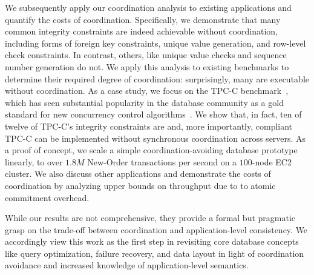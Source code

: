 
We subsequently apply our \iconfluence coordination analysis to
existing applications and quantify the costs of
coordination. Specifically, we demonstrate that many common integrity
constraints are indeed achievable without coordination, including
forms of foreign key constraints, unique value generation, and
row-level check constraints. In contrast, others, like unique value
checks and sequence number generation do not. We apply this analysis
to existing benchmarks to determine their required degree of
coordination: surprisingly, many are executable without
coordination. As a case study, we focus on the TPC-C
benchmark~\cite{tpcc}, which has seen substantial popularity in the
database community as a gold standard for new concurrency control
algorithms~\cite{abadi-vll,jones-dtxn,schism,calvin,hstore}. We show
that, in fact, ten of twelve of TPC-C's integrity constraints are
\iconfluent and, more importantly, compliant TPC-C can be implemented
without synchronous coordination across servers. As a proof of
concept, we scale a simple coordination-avoiding database prototype
linearly, to over $1.8M$ New-Order transactions per second on a
$100$-node EC2 cluster. We also discuss other applications and
demonstrate the costs of coordination by analyzing upper bounds on
throughput due to to atomic commitment overhead.

While our results are not comprehensive, they provide a formal but
pragmatic grasp on the trade-off between coordination and
application-level consistency. We accordingly view this work as the
first step in revisiting core database concepts like query
optimization, failure recovery, and data layout in light of
coordination avoidance and increased knowledge of application-level
semantics.


